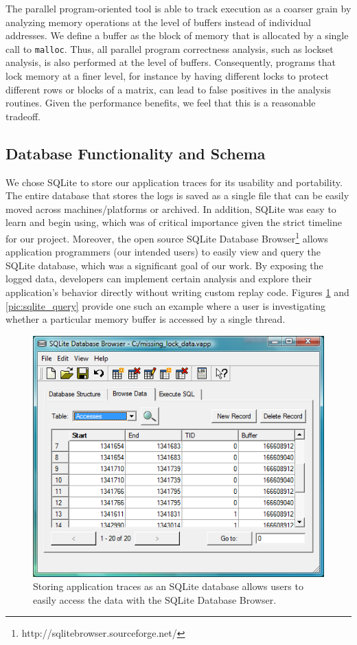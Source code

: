 The parallel program-oriented tool is able to track execution
as a coarser grain by analyzing memory operations at the level
of buffers instead of individual addresses.  We define a buffer
as the block of memory that is allocated by a single call to
\texttt{malloc}.  Thus, all parallel program correctness analysis,
such as lockset analysis, is also performed at the level of buffers.
Consequently, programs that lock memory at a finer level, for instance
by having different locks to protect different rows or blocks of a matrix,
can lead to false positives in the analysis routines.
Given the performance benefits, we feel that this is a reasonable tradeoff.

\subsection{Database Functionality and Schema}
We chose SQLite to store our application traces for its usability
and portability.  The entire database that stores the logs is
saved as a single file that can be easily moved across machines/platforms
or archived.  In addition, SQLite was easy to learn and begin
using, which was of critical importance given the strict timeline
for our project.  Moreover, the open source
SQLite Database Browser\footnote{http://sqlitebrowser.sourceforge.net/}
allows application programmers (our intended users) to easily view
and query the SQLite database, which was a significant goal of our
work.  By exposing the logged data, developers can implement
certain analysis and explore their application's behavior directly
without writing custom replay code.  Figures \ref{pic:sqlite_browse}
and \ref{pic:sqlite_query}
provide one such an example where a user is investigating
whether a particular memory buffer is accessed by a single thread.


\begin{figure}
  \includegraphics[width=\columnwidth]{sqlite_browse}
  \caption{Storing application traces as an SQLite database
  	allows users to easily access the data with the SQLite
  	Database Browser.}
  \label{pic:sqlite_browse}
\end{figure}


